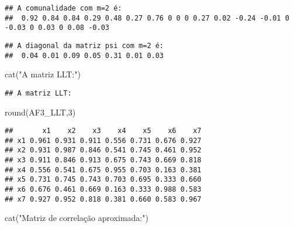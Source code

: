 \documentclass[
]{article}
\newenvironment{Shaded}{\begin{snugshade}}{\end{snugshade}}
\newcommand{\DecValTok}[1]{\textcolor[rgb]{0.00,0.00,0.81}{#1}}
\newcommand{\FunctionTok}[1]{\textcolor[rgb]{0.00,0.00,0.00}{#1}}
\newcommand{\NormalTok}[1]{#1}
\newcommand{\SpecialCharTok}[1]{\textcolor[rgb]{0.00,0.00,0.00}{#1}}
\newcommand{\StringTok}[1]{\textcolor[rgb]{0.31,0.60,0.02}{#1}}
\begin{document}
\begin{verbatim}
## A comunalidade com m=2 é:
##  0.92 0.84 0.84 0.29 0.48 0.27 0.76 0 0 0 0.27 0.02 -0.24 -0.01 0 -0.03 0 0.03 0 0.08 -0.03
\end{verbatim}

\begin{Shaded}
\end{Shaded}

\begin{verbatim}
## A diagonal da matriz psi com m=2 é:
##  0.04 0.01 0.09 0.05 0.31 0.01 0.03
\end{verbatim}

\begin{Shaded}
\begin{Highlighting}[]
\FunctionTok{cat}\NormalTok{(}\StringTok{"A matriz LLT:"}\NormalTok{)}
\end{Highlighting}
\end{Shaded}

\begin{verbatim}
## A matriz LLT:
\end{verbatim}

\begin{Shaded}
\begin{Highlighting}[]
\FunctionTok{round}\NormalTok{(AF3\_LLT,}\DecValTok{3}\NormalTok{)}
\end{Highlighting}
\end{Shaded}

\begin{verbatim}
##       x1    x2    x3    x4    x5    x6    x7
## x1 0.961 0.931 0.911 0.556 0.731 0.676 0.927
## x2 0.931 0.987 0.846 0.541 0.745 0.461 0.952
## x3 0.911 0.846 0.913 0.675 0.743 0.669 0.818
## x4 0.556 0.541 0.675 0.955 0.703 0.163 0.381
## x5 0.731 0.745 0.743 0.703 0.695 0.333 0.660
## x6 0.676 0.461 0.669 0.163 0.333 0.988 0.583
## x7 0.927 0.952 0.818 0.381 0.660 0.583 0.967
\end{verbatim}

\begin{Shaded}
\begin{Highlighting}[]
\FunctionTok{cat}\NormalTok{(}\StringTok{"Matriz de correlação aproximada:"}\NormalTok{)}
\end{Highlighting}
\end{Shaded}
\end{document}
